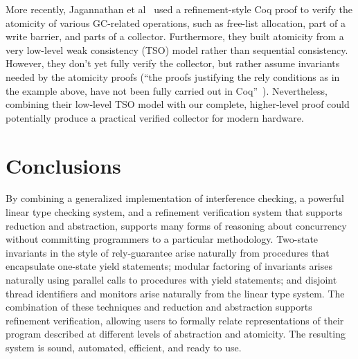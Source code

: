 More recently,
Jagannathan et al~\cite{Jagannathan14} used a refinement-style Coq proof to verify the atomicity of various GC-related operations,
such as free-list allocation,
part of a write barrier, and parts of a collector.
Furthermore, they built atomicity from a very low-level weak consistency (TSO) model rather than sequential consistency.
However, they don't yet fully verify the collector,
but rather assume invariants needed by the atomicity proofs
(``the proofs justifying the rely conditions as in the example above,
have not been fully carried out in Coq''~\cite{Jagannathan14}).
Nevertheless, combining their low-level TSO model with our complete,
higher-level proof could potentially produce a practical verified collector for modern hardware.

\section{Conclusions}

By combining a generalized implementation of interference checking, a powerful linear type checking system, and a refinement verification system that supports reduction and abstraction, 
\civl supports many forms of reasoning about concurrency without committing programmers to a particular methodology.
Two-state invariants in the style of rely-guarantee arise naturally from procedures that encapsulate one-state yield statements;
modular factoring of invariants arises naturally using parallel calls to procedures with yield statements;
and disjoint thread identifiers and monitors arise naturally from the linear type system. The combination of these techniques and reduction and abstraction supports refinement verification, allowing users to formally relate representations of their program described at different levels of abstraction and atomicity. 
The resulting system is sound, automated, efficient, and ready to use.

